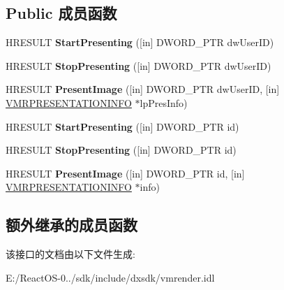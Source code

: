 \subsection*{Public 成员函数}
\begin{DoxyCompactItemize}
\item 
\mbox{\label{interface_i_v_m_r_image_presenter_a0b982938c06236fc3a242bbfcf4fb293}} 
H\+R\+E\+S\+U\+LT {\bfseries Start\+Presenting} (\mbox{[}in\mbox{]} D\+W\+O\+R\+D\+\_\+\+P\+TR dw\+User\+ID)
\item 
\mbox{\label{interface_i_v_m_r_image_presenter_ac1568fe07cbe9a16e56a2a68f7cf52c2}} 
H\+R\+E\+S\+U\+LT {\bfseries Stop\+Presenting} (\mbox{[}in\mbox{]} D\+W\+O\+R\+D\+\_\+\+P\+TR dw\+User\+ID)
\item 
\mbox{\label{interface_i_v_m_r_image_presenter_a424098f775223c19a4710f012a097673}} 
H\+R\+E\+S\+U\+LT {\bfseries Present\+Image} (\mbox{[}in\mbox{]} D\+W\+O\+R\+D\+\_\+\+P\+TR dw\+User\+ID, \mbox{[}in\mbox{]} \hyperlink{structtag_v_m_r_p_r_e_s_e_n_t_a_t_i_o_n_i_n_f_o}{V\+M\+R\+P\+R\+E\+S\+E\+N\+T\+A\+T\+I\+O\+N\+I\+N\+FO} $\ast$lp\+Pres\+Info)
\item 
\mbox{\label{interface_i_v_m_r_image_presenter_a7f9711bd0829b98d880417082040898b}} 
H\+R\+E\+S\+U\+LT {\bfseries Start\+Presenting} (\mbox{[}in\mbox{]} D\+W\+O\+R\+D\+\_\+\+P\+TR id)
\item 
\mbox{\label{interface_i_v_m_r_image_presenter_a710a56f4cc25862bf589b2fbc59ab078}} 
H\+R\+E\+S\+U\+LT {\bfseries Stop\+Presenting} (\mbox{[}in\mbox{]} D\+W\+O\+R\+D\+\_\+\+P\+TR id)
\item 
\mbox{\label{interface_i_v_m_r_image_presenter_ad08b38a1f4e859f37b75c4b5bb2a94f8}} 
H\+R\+E\+S\+U\+LT {\bfseries Present\+Image} (\mbox{[}in\mbox{]} D\+W\+O\+R\+D\+\_\+\+P\+TR id, \mbox{[}in\mbox{]} \hyperlink{structtag_v_m_r_p_r_e_s_e_n_t_a_t_i_o_n_i_n_f_o}{V\+M\+R\+P\+R\+E\+S\+E\+N\+T\+A\+T\+I\+O\+N\+I\+N\+FO} $\ast$info)
\end{DoxyCompactItemize}
\subsection*{额外继承的成员函数}


该接口的文档由以下文件生成\+:\begin{DoxyCompactItemize}
\item 
E\+:/\+React\+O\+S-\/0../sdk/include/dxsdk/vmrender.\+idl\end{DoxyCompactItemize}
